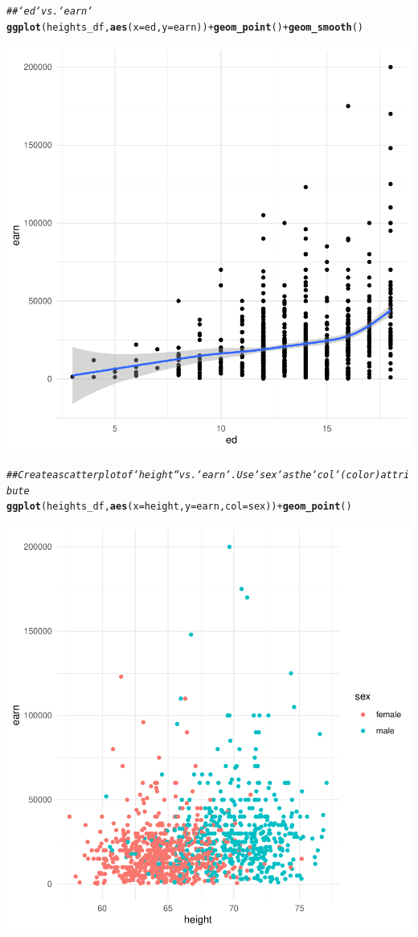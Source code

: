 \documentclass{article}\usepackage[]{graphicx}\usepackage[]{xcolor}
\makeatletter
\newcommand{\hlcom}[1]{\textcolor[rgb]{0.678,0.584,0.686}{\textit{#1}}}%
\newcommand{\hlopt}[1]{\textcolor[rgb]{0,0,0}{#1}}%
\newcommand{\hlstd}[1]{\textcolor[rgb]{0.345,0.345,0.345}{#1}}%
\newcommand{\hlkwc}[1]{\textcolor[rgb]{0.333,0.667,0.333}{#1}}%
\newcommand{\hlkwd}[1]{\textcolor[rgb]{0.737,0.353,0.396}{\textbf{#1}}}%
\newenvironment{kframe}{%
 \def\at@end@of@kframe{}%
 \ifinner\ifhmode%
  \def\at@end@of@kframe{\end{minipage}}%
  \begin{minipage}{\columnwidth}%
 \fi\fi%
 \def\FrameCommand##1{\hskip\@totalleftmargin \hskip-\fboxsep
 \colorbox{shadecolor}{##1}\hskip-\fboxsep
     \hskip-\linewidth \hskip-\@totalleftmargin \hskip\columnwidth}%
 \MakeFramed {\advance\hsize-\width
   \@totalleftmargin\z@ \linewidth\hsize
   \@setminipage}}%
 {\par\unskip\endMakeFramed%
 \at@end@of@kframe}
\newenvironment{knitrout}{}{} %
\makeatother
\begin{document}
\begin{knitrout}
{}


\begin{kframe}\begin{alltt}
\hlcom{## `ed` vs. `earn`}
\hlkwd{ggplot}\hlstd{(heights_df,} \hlkwd{aes}\hlstd{(}\hlkwc{x}\hlstd{=ed,} \hlkwc{y}\hlstd{=earn))} \hlopt{+} \hlkwd{geom_point}\hlstd{()} \hlopt{+} \hlkwd{geom_smooth}\hlstd{()}
\end{alltt}


{\ttfamily\noindent\itshape{}}\end{kframe}

{\centering \includegraphics[width=.6\linewidth]{figure/assignment-03-ChattapadhyayKausik-Rnwauto-report-6} 

}


\begin{kframe}\begin{alltt}
\hlcom{## Create a scatterplot of `height`` vs. `earn`.  Use `sex` as the `col` (color) attribute}
\hlkwd{ggplot}\hlstd{(heights_df,} \hlkwd{aes}\hlstd{(}\hlkwc{x}\hlstd{=height,} \hlkwc{y}\hlstd{=earn,} \hlkwc{col}\hlstd{=sex))} \hlopt{+} \hlkwd{geom_point}\hlstd{()}
\end{alltt}
\end{kframe}

{\centering \includegraphics[width=.6\linewidth]{figure/assignment-03-ChattapadhyayKausik-Rnwauto-report-7} 

}
\end{knitrout}
\end{document}
